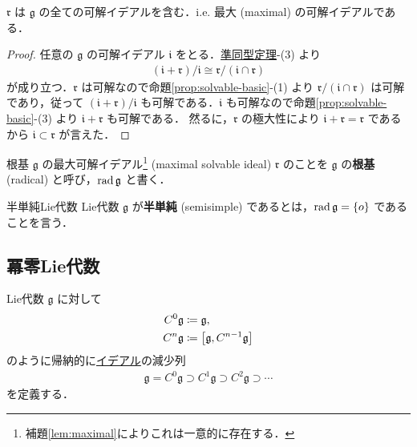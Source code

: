\documentclass[rep_main]{subfiles}
\begin{document}
\begin{mylem}[label=lem:maximal]{}
    $\mathfrak{r}$ は $\mathfrak{g}$ の全ての可解イデアルを含む．i.e. 最大 (maximal) の可解イデアルである．
\end{mylem}

\begin{proof}
    任意の $\mathfrak{g}$ の可解イデアル $\mathfrak{i}$ をとる．\hyperref[prop:homo]{準同型定理}-(3) より
    \begin{align}
        (\mathfrak{i} + \mathfrak{r})/\mathfrak{i} \cong \mathfrak{r} / (\mathfrak{i} \cap \mathfrak{r})
    \end{align}
    が成り立つ．$\mathfrak{r}$ は可解なので命題\ref{prop:solvable-basic}-(1) より $\mathfrak{r} / (\mathfrak{i} \cap \mathfrak{r})$ は可解であり，従って $(\mathfrak{i} + \mathfrak{r})/\mathfrak{i}$ も可解である．$\mathfrak{i}$ も可解なので命題\ref{prop:solvable-basic}-(3) より $\mathfrak{i} + \mathfrak{r}$ も可解である．
    然るに，$\mathfrak{r}$ の極大性により $\mathfrak{i} + \mathfrak{r} = \mathfrak{r}$ であるから $\mathfrak{i} \subset \mathfrak{r}$ が言えた．
\end{proof}

\begin{mydef}[label=def:rad-LieAlg]{根基}
    $\mathfrak{g}$ の最大可解イデアル\footnote{補題\ref{lem:maximal}によりこれは一意的に存在する．} (maximal solvable ideal) $\mathfrak{r}$ のことを $\mathfrak{g}$ の\textbf{根基} (radical) と呼び，$\operatorname{rad} \mathfrak{g}$ と書く．
\end{mydef}

\begin{mydef}[label=def:semisimple-LieAlg]{半単純Lie代数}
    Lie代数 $\mathfrak{g}$ が\textbf{半単純} (semisimple) であるとは，$\operatorname{rad} \mathfrak{g} = \{o\}$ であることを言う．
\end{mydef}

\subsection{冪零Lie代数}

Lie代数 $\mathfrak{g}$ に対して
\begin{align}
    C^0 \mathfrak{g} &\coloneqq \mathfrak{g}, \\
    C^n \mathfrak{g} &\coloneqq \comm{\mathfrak{g}}{C^{n-1} \mathfrak{g}}
\end{align}
のように帰納的に\hyperref[def:ideal-LieAlg]{イデアル}の減少列
\begin{align}
    \label{eq:descendingCentralSeries}
    \mathfrak{g} = C^0 \mathfrak{g} \supset C^1 \mathfrak{g} \supset C^2 \mathfrak{g} \supset \cdots
\end{align}
を定義する．
\end{document}
